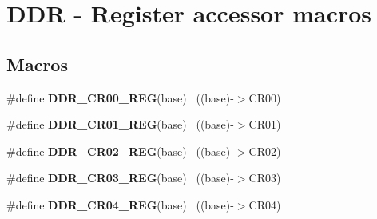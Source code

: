 \hypertarget{group___d_d_r___register___accessor___macros}{}\section{D\+D\+R -\/ Register accessor macros}
\label{group___d_d_r___register___accessor___macros}
\subsection*{Macros}
\begin{DoxyCompactItemize}
\item 
\hypertarget{group___d_d_r___register___accessor___macros_ga15834efa2dcb6229b193ccb17d572c1e}{}\#define {\bfseries D\+D\+R\+\_\+\+C\+R00\+\_\+\+R\+E\+G}(base)                                          ~((base)-\/$>$C\+R00)\label{group___d_d_r___register___accessor___macros_ga15834efa2dcb6229b193ccb17d572c1e}

\item 
\hypertarget{group___d_d_r___register___accessor___macros_ga4bdd0ac98fe6ed4a51fc7aac75eef0ed}{}\#define {\bfseries D\+D\+R\+\_\+\+C\+R01\+\_\+\+R\+E\+G}(base)                                          ~((base)-\/$>$C\+R01)\label{group___d_d_r___register___accessor___macros_ga4bdd0ac98fe6ed4a51fc7aac75eef0ed}

\item 
\hypertarget{group___d_d_r___register___accessor___macros_ga0958a4bcbf02735b766b7fc4545b342c}{}\#define {\bfseries D\+D\+R\+\_\+\+C\+R02\+\_\+\+R\+E\+G}(base)                                          ~((base)-\/$>$C\+R02)\label{group___d_d_r___register___accessor___macros_ga0958a4bcbf02735b766b7fc4545b342c}

\item 
\hypertarget{group___d_d_r___register___accessor___macros_ga0b468e646b4a8c385c8b19449c470a74}{}\#define {\bfseries D\+D\+R\+\_\+\+C\+R03\+\_\+\+R\+E\+G}(base)                                          ~((base)-\/$>$C\+R03)\label{group___d_d_r___register___accessor___macros_ga0b468e646b4a8c385c8b19449c470a74}

\item 
\hypertarget{group___d_d_r___register___accessor___macros_ga75e7dfc42dd65450983b5fcd00a3b222}{}\#define {\bfseries D\+D\+R\+\_\+\+C\+R04\+\_\+\+R\+E\+G}(base)                                          ~((base)-\/$>$C\+R04)\label{group___d_d_r___register___accessor___macros_ga75e7dfc42dd65450983b5fcd00a3b222}


\end{DoxyCompactItemize}
